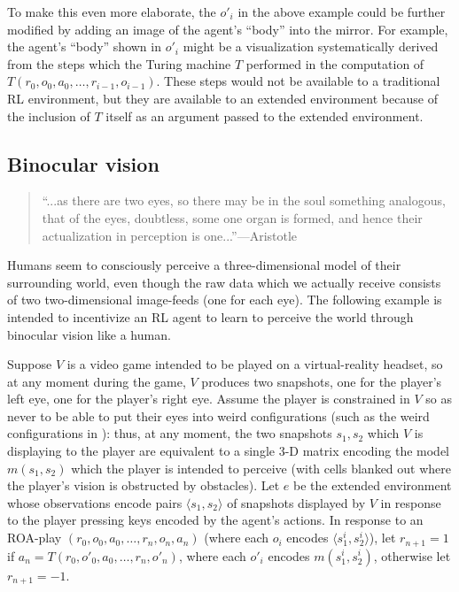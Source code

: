 \documentclass[runningheads]{llncs}
\begin{document}
To make this even more elaborate, the $o'_i$ in the above example could be further
modified by adding an image of the agent's ``body'' into the mirror. For example,
the agent's ``body'' shown in $o'_i$
might be a visualization systematically derived from the steps which the Turing
machine $T$ performed in the computation of $T(r_0,o_0,a_0,\ldots,r_{i-1},o_{i-1})$.
These steps would not be available to a traditional RL environment, but they are
available to an extended environment because of the inclusion of $T$ itself as an
argument passed to the extended environment.

\subsection{Binocular vision}

\begin{quote}
    ``...as there are two eyes, so there may be in the soul
    something analogous, that of the eyes, doubtless, some one organ is formed, and
    hence their actualization in perception is one...''---Aristotle
    \cite{aristotlesense}
\end{quote}

Humans seem to consciously perceive a three-dimensional model of their surrounding
world, even though the raw data which we actually receive consists of two two-dimensional
image-feeds (one for each eye). The following example is intended to incentivize an RL
agent to learn to perceive the world through binocular vision like a human.

\begin{example}
\label{binocularexample}
    Suppose $V$ is a video game intended to be played on a virtual-reality headset,
    so at any moment during the game, $V$ produces two snapshots, one for the player's
    left eye, one for the player's right eye. Assume the player is constrained in $V$
    so as never to be able to put their eyes into weird configurations (such as
    the weird configurations in
    \cite{gallagher2020third}): thus, at any moment, the two snapshots $s_1,s_2$
    which $V$ is
    displaying to the player are equivalent to a single 3-D matrix encoding
    the model $m(s_1,s_2)$ which the player is intended to perceive (with cells blanked
    out where the player's vision is obstructed by obstacles). Let $e$ be the extended
    environment whose observations encode pairs $\langle s_1,s_2\rangle$ of snapshots
    displayed by $V$ in response to the player pressing keys encoded by the agent's
    actions. In response to an ROA-play $(r_0,o_0,a_0,\ldots,r_n,o_n,a_n)$ (where
    each $o_i$ encodes $\langle s^i_1,s^i_2\rangle$), let $r_{n+1}=1$ if
    $a_n=T(r_0,o'_0,a_0,\ldots,r_n,o'_n)$, where each $o'_i$ encodes
    $m(s^i_1,s^i_2)$, otherwise let $r_{n+1}=-1$.
\end{example}
\end{document}
